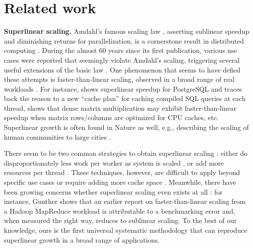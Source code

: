\section{Related work}
\label{sec:related-work}

\noindent%
\textbf{Superlinear scaling.} %
Amdahl's famous scaling law \cite{10.1145/1465482.1465560}, asserting sublinear speedup and diminishing returns for parallelization, is a cornerstone result in distributed computing \cite{10.1145/42411.42415, 10.5555/775339.775386,1580395, 10.5555/1951599, 10.1145/42411.42415}. During the almost 60 years since its first publication, various use cases were reported that seemingly violate Amdahl's scaling, triggering several useful extensions of the basic law \cite{4563876, 6280307, 406581, 6163449, 10.5555/1951599}. One phenomenon that seems to have defied these attempts is faster-than-linear scaling, observed in a broad range of real workloads \cite{scalability-analyzed, 10.1145/3627703.3629574, 10.5555/1012889.1012894, sdn-analytitcs, 556383, 7733347, 6483679, 10.1007/978-3-319-77610-1,dobb-1, dobb-2}. For instance, \cite{scalability-analyzed} shows superlinear speedup for PostgreSQL and traces back the reason to a new ``cache plan'' for caching compiled SQL queries at each thread, \cite{7733347} shows that dense matrix multiplication may exhibit faster-than-linear speedup when matrix rows\slash columns are optimized for CPU caches, etc. Superlinear growth is often found in Nature as well, e.g., describing the scaling of human communities to large cities \cite{PhysRevE.79.016115}.

There seem to be two common strategies to obtain superlinear scaling \cite{7733347, 80148}: either do disproportionately less work per worker as system is scaled \cite{7733347}, or add more resources per thread \cite{80148}. These techniques, however, are difficult to apply beyond specific use cases \cite{556383} or require adding more cache space \cite{7733347}. Meanwhile, there have been growing concerns whether superlinear scaling even exists at all \cite{10.1016/0167-8191(86)90024-4}: for instance, Gunther shows that an earlier report on faster-than-linear scaling from a Hadoop MapReduce workload is attributable to a benchmarking error and, when measured the right way, reduces to sublinear scaling. %
To the best of our knowledge, ours is the first universal systematic methodology that can reproduce superlinear growth in a broad range of applications.

